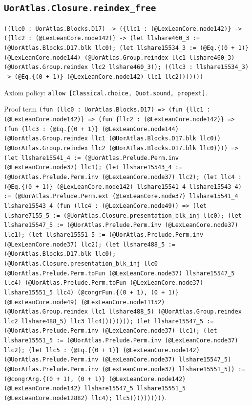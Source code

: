 \documentclass[11pt]{article}
\begin{document}
\subsection*{\texttt{UorAtlas.Closure.reindex\_free}}
\noindent\texttt{((llc0 : UorAtlas.Blocks.D17) -> (\{llc1 : (@LexLeanCore.node142)\} -> (\{llc2 : (@LexLeanCore.node142)\} -> (let llshare460\_3 := (@UorAtlas.Blocks.D17.blk llc0); (let llshare15534\_3 := (@Eq.\{(0 + 1)\} (@LexLeanCore.node144) (@UorAtlas.Group.reindex llc1 llshare460\_3) (@UorAtlas.Group.reindex llc2 llshare460\_3)); ((llc3 : llshare15534\_3) -> (@Eq.\{(0 + 1)\} (@LexLeanCore.node142) llc1 llc2)))))))}\par
\noindent Axiom policy: \texttt{allow [Classical.choice, Quot.sound, propext]}.\par
\noindent Proof term \texttt{(fun (llc0 : UorAtlas.Blocks.D17) => (fun \{llc1 : (@LexLeanCore.node142)\} => (fun \{llc2 : (@LexLeanCore.node142)\} => (fun (llc3 : (@Eq.\{(0 + 1)\} (@LexLeanCore.node144) (@UorAtlas.Group.reindex llc1 (@UorAtlas.Blocks.D17.blk llc0)) (@UorAtlas.Group.reindex llc2 (@UorAtlas.Blocks.D17.blk llc0)))) => (let llshare15541\_4 := (@UorAtlas.Prelude.Perm.inv (@LexLeanCore.node37) llc1); (let llshare15543\_4 := (@UorAtlas.Prelude.Perm.inv (@LexLeanCore.node37) llc2); (let llc4 : (@Eq.\{(0 + 1)\} (@LexLeanCore.node142) llshare15541\_4 llshare15543\_4) := (@UorAtlas.Prelude.Perm.ext (@LexLeanCore.node37) llshare15541\_4 llshare15543\_4 (fun (llc4 : (@LexLeanCore.node49)) => (let llshare7155\_5 := (@UorAtlas.Closure.presentation\_blk\_inj llc0); (let llshare15547\_5 := (@UorAtlas.Prelude.Perm.inv (@LexLeanCore.node37) llc1); (let llshare15551\_5 := (@UorAtlas.Prelude.Perm.inv (@LexLeanCore.node37) llc2); (let llshare488\_5 := (@UorAtlas.Blocks.D17.blk llc0); (@UorAtlas.Closure.presentation\_blk\_inj llc0 (@UorAtlas.Prelude.Perm.toFun (@LexLeanCore.node37) llshare15547\_5 llc4) (@UorAtlas.Prelude.Perm.toFun (@LexLeanCore.node37) llshare15551\_5 llc4) (@congrFun.\{(0 + 1), (0 + 1)\} (@LexLeanCore.node49) (@LexLeanCore.node11152) (@UorAtlas.Group.reindex llc1 llshare488\_5) (@UorAtlas.Group.reindex llc2 llshare488\_5) llc3 llc4)))))))); (let llshare15547\_5 := (@UorAtlas.Prelude.Perm.inv (@LexLeanCore.node37) llc1); (let llshare15551\_5 := (@UorAtlas.Prelude.Perm.inv (@LexLeanCore.node37) llc2); (let llc5 : (@Eq.\{(0 + 1)\} (@LexLeanCore.node142) (@UorAtlas.Prelude.Perm.inv (@LexLeanCore.node37) llshare15547\_5) (@UorAtlas.Prelude.Perm.inv (@LexLeanCore.node37) llshare15551\_5)) := (@congrArg.\{(0 + 1), (0 + 1)\} (@LexLeanCore.node142) (@LexLeanCore.node142) llshare15547\_5 llshare15551\_5 (@LexLeanCore.node12882) llc4); llc5))))))))))}.\par
\end{document}
